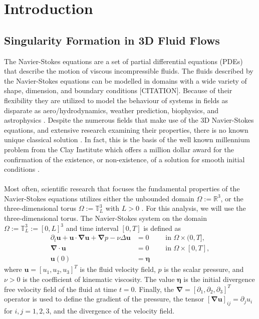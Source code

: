 \documentclass[12pt]{article}
\def\u{\boldsymbol u}
\def\bn{\boldsymbol \nabla}
\def\be{\boldsymbol \eta}
\def\RR{\mathbb{R}}
\def\TT{\mathbb{T}}
\numberwithin{equation}{section}
\begin{document}
\pagebreak


\section{Introduction}
\subsection{Singularity Formation in 3D Fluid Flows}
The Navier-Stokes equations are a set of partial differential equations (PDEs) that describe the motion of viscous incompressible fluids. The fluids described by the Navier-Stokes equations can be modelled in domains with a wide variety of shape, dimension, and boundary conditions [CITATION]. Because of their flexibility they are utilized to model the behaviour of systems in fields as disparate as aero/hydrodynamics, weather prediction, biophysics, and astrophysics \cite{cho_solving_2022}\cite{doering_3d_2009}. Despite the numerous fields that make use of the 3D Navier-Stokes equations, and extensive research examining their properties, there is no known unique classical solution \cite{protas_systematic_2022}. In fact, this is the basis of the well known millennium problem from the Clay Institute which offers a million dollar award for the confirmation of the existence, or non-existence, of a solution for smooth initial conditions \cite{robinson_navierstokes_2020}.
\\~\\
Most often, scientific research that focuses the fundamental properties of the Navier-Stokes equations utilizes either the unbounded domain $\Omega := \RR^3$, or the three-dimensional torus $\Omega := \TT^3_L$ with $L>0$ \cite{protas_systematic_2022}. For this analysis, we will use the three-dimensional torus. The Navier-Stokes system on the domain $\Omega := \TT^3_L := [0,L]^3$ and time interval $[0,T]$ is defined as 
\begin{subequations}\label{eq:Navier:Stokes}
\begin{align}
\partial_t \u + \u\cdot \bn \u + \bn p - \nu \Delta \u &= 0 \qquad\text{ in } \Omega\times (0,T],\\
\bn \cdot \u &= 0 \qquad\text{ in } \Omega\times [0,T],\\
\u(0) &= \be
\end{align}
\end{subequations}
where $\u = [u_1,u_2,u_3]^T$ is the fluid velocity field, $p$ is the scalar pressure, and $\nu>0$ is the coefficient of kinematic viscosity. The value $\be$ is the initial divergence free velocity field of the fluid at time $t=0$. Finally, the $\bn = [\partial_1,\partial_2,\partial_3]^T$ operator is used to define the gradient of the pressure, the tensor $[\bn \u]_{ij}=\partial_j u_i$ for $i,j=1,2,3$, and the divergence of the velocity field.
\end{document}
